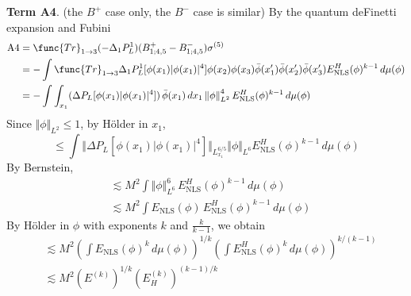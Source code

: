\documentclass[12pt,letterpaper,leqno]{amsart}
\theoremstyle{plain}
\numberwithin{equation}{section}
\numberwithin{theorem}{section}
\numberwithin{proposition}{section}
\numberwithin{lemma}{section}
\numberwithin{corollary}{section}
\begin{document}
\noindent \textbf{Term A4}. (the $B^{+}$ case only, the $B^{-}$ case is
similar) By the quantum deFinetti expansion and Fubini 
\begin{align*}
\text{A4}& =\func{Tr}_{1\rightarrow 3}(-\Delta
_{1}P_{L}^{1})(B_{1;4,5}^{+}-B_{1;4,5}^{-})\sigma ^{(5)} \\
& =-\int \func{Tr}_{1\rightarrow 3}\Delta _{1}P_{L}^{1}[\phi (x_{1})|\phi
(x_{1})|^{4}]\phi (x_{2})\phi (x_{3})\bar{\phi}(x_{1}^{\prime })\bar{\phi}%
(x_{2}^{\prime })\bar{\phi}(x_{3}^{\prime })E_{\text{NLS}}^{H}(\phi
)^{k-1}\,d\mu (\phi ) \\
& =-\int \int_{x_{1}}(\Delta P_{L}[\phi (x_{1})|\phi (x_{1})|^{4}])\,\bar{%
\phi}(x_{1})\,dx_{1}\left\Vert \phi \right\Vert _{L^{2}}^{4}E_{\text{NLS}%
}^{H}(\phi )^{k-1}\,d\mu (\phi )
\end{align*}%
Since $\Vert \phi \Vert _{L^{2}}\leqslant 1$, by H\"{o}lder in $x_{1}$, 
\begin{equation*}
\leqslant \int \Vert \Delta P_{L}[\phi (x_{1})|\phi (x_{1})|^{4}]\Vert
_{L_{x_{1}}^{6/5}}\Vert \phi \Vert _{L^{6}}E_{\text{NLS}}^{H}(\phi
)^{k-1}\,d\mu (\phi )
\end{equation*}%
By Bernstein, 
\begin{align*}
& \lesssim M^{2}\int \Vert \phi \Vert _{L^{6}}^{6}\,E_{\text{NLS}}^{H}(\phi
)^{k-1}\,d\mu (\phi ) \\
& \lesssim M^{2}\int E_{\text{NLS}}(\phi )\,E_{\text{NLS}}^{H}(\phi
)^{k-1}\,d\mu (\phi )
\end{align*}%
By H\"{o}lder in $\phi $ with exponents $k$ and $\frac{k}{k-1}$, we obtain 
\begin{align*}
& \lesssim M^{2}\left( \int E_{\text{NLS}}(\phi )^{k}\,d\mu (\phi )\right)
^{1/k}\left( \int E_{\text{NLS}}^{H}(\phi )^{k}\,d\mu (\phi )\right)
^{k/(k-1)} \\
& \lesssim M^{2}(E^{(k)})^{1/k}(E_{H}^{(k)})^{(k-1)/k}
\end{align*}
\end{document}
